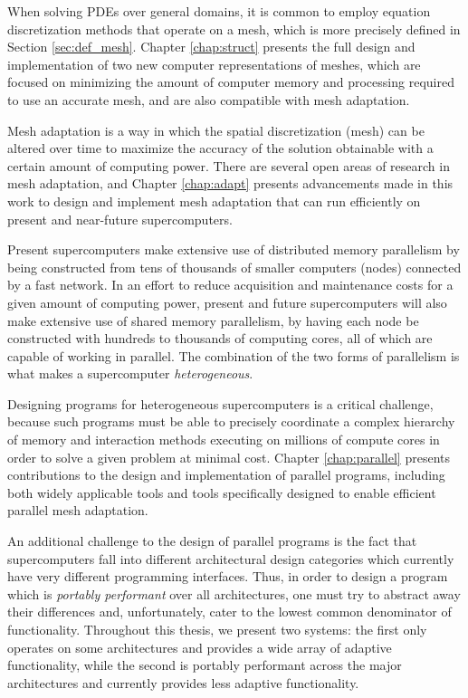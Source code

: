 When solving PDEs over general domains, it is common to
employ equation discretization methods that operate on a mesh,
which is more precisely defined in Section \ref{sec:def_mesh}.
Chapter \ref{chap:struct} presents the full design
and implementation of two new computer representations
of meshes, which are focused on minimizing the amount
of computer memory and processing required to use
an accurate mesh, and are also compatible with mesh adaptation.

Mesh adaptation is a way in which the spatial discretization
(mesh) can be altered over time to maximize the accuracy
of the solution obtainable with a certain amount
of computing power.
There are several open areas of research in mesh adaptation,
and Chapter \ref{chap:adapt} presents advancements
made in this work to design and implement
mesh adaptation that can run efficiently on present
and near-future supercomputers.

Present supercomputers make extensive use of distributed
memory parallelism by being constructed from tens of thousands of
smaller computers (nodes) connected by a fast network.
In an effort to reduce acquisition and maintenance costs
for a given amount of computing power,
present and future supercomputers will also make extensive use
of shared memory parallelism, by having each node be constructed
with hundreds to thousands of computing cores, all of which
are capable of working in parallel.
The combination of the two forms of parallelism is what
makes a supercomputer \emph{heterogeneous}.

Designing programs for heterogeneous supercomputers is a critical
challenge, because such programs must be able to precisely coordinate
a complex hierarchy of memory and interaction methods executing on
millions of compute cores
in order to solve a given problem at minimal cost.
Chapter \ref{chap:parallel} presents contributions to
the design and implementation of parallel programs,
including both widely applicable tools and tools specifically
designed to enable efficient parallel mesh adaptation.

An additional challenge to the design of parallel programs
is the fact that supercomputers fall into different
architectural design categories which currently
have very different programming interfaces.
Thus, in order to design a program which is \emph{portably performant}
over all architectures, one must try to abstract away
their differences and, unfortunately, cater to the
lowest common denominator of functionality.
Throughout this thesis, we present two systems:
the first only operates on some architectures and provides
a wide array of adaptive functionality, while the second
is portably performant across the major architectures
and currently provides less adaptive functionality.

